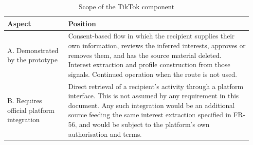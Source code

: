 \documentclass[11pt,a4paper]{report}
\begin{document}
\begin{table}[htbp]
\centering\small
\caption{Scope of the TikTok component}\label{tab:tiktok-scope}
\begin{tabularx}{\textwidth}{@{}L{5.3cm}X@{}}
\toprule
\textbf{Aspect} & \textbf{Position} \\ \midrule
A. Demonstrated by the prototype &
Consent-based flow in which the recipient supplies their own information, reviews the
inferred interests, approves or removes them, and has the source material deleted. Interest
extraction and profile construction from those signals. Continued operation when the route
is not used. \\
B. Requires official platform integration &
Direct retrieval of a recipient's activity through a platform interface. This is not assumed
by any requirement in this document. Any such integration would be an additional source
feeding the same interest extraction specified in FR-56, and would be subject to the
platform's own authorisation and terms. \\
\bottomrule
\end{tabularx}
\end{table}
\end{document}
